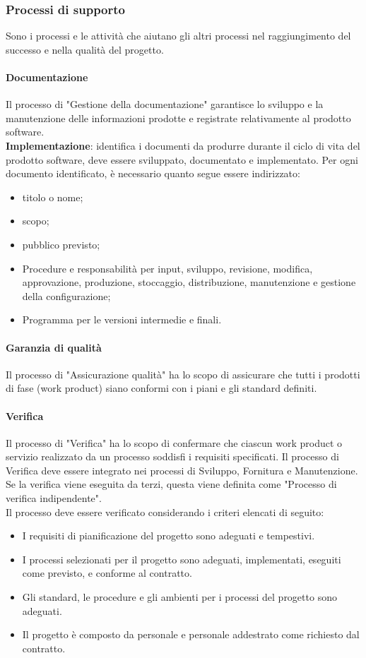 \subsubsection{Processi di supporto}
Sono i processi e le attività che aiutano gli altri processi nel raggiungimento del successo e nella qualità del progetto.

\paragraph{Documentazione}
Il processo di "Gestione della documentazione" garantisce lo sviluppo e la manutenzione delle informazioni prodotte e registrate relativamente al prodotto software.
\\
\textbf{Implementazione}: identifica i documenti da produrre durante il ciclo di vita del prodotto software,
deve essere sviluppato, documentato e implementato. Per ogni documento identificato, è necessario quanto segue
essere indirizzato:
\begin{itemize}
    \item titolo o nome;
    \item scopo;
    \item pubblico previsto;
    \item Procedure e responsabilità per input, sviluppo, revisione, modifica, approvazione, produzione, stoccaggio, distribuzione, manutenzione e gestione della configurazione;
    \item Programma per le versioni intermedie e finali.
\end{itemize}

\paragraph{Garanzia di qualità}
Il processo di "Assicurazione qualità" ha lo scopo di assicurare che tutti i prodotti di fase (work product) siano conformi con i piani e gli standard definiti.
\paragraph{Verifica}
Il processo di "Verifica" ha lo scopo di confermare che ciascun work product o servizio realizzato da un processo soddisfi i requisiti specificati. 
Il processo di Verifica deve essere integrato nei processi di Sviluppo, Fornitura e Manutenzione. Se la verifica viene eseguita da terzi, questa viene definita come "Processo di verifica indipendente".
\\
Il processo deve essere verificato considerando i criteri elencati di seguito:
\begin{itemize}
    \item I requisiti di pianificazione del progetto sono adeguati e tempestivi.
    \item I processi selezionati per il progetto sono adeguati, implementati, eseguiti come previsto, e conforme al contratto.
    \item Gli standard, le procedure e gli ambienti per i processi del progetto sono adeguati.
    \item Il progetto è composto da personale e personale addestrato come richiesto dal contratto.
\end{itemize}

